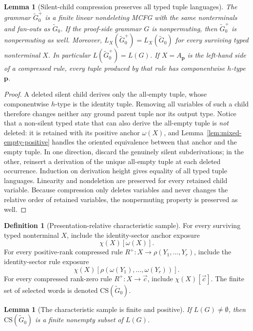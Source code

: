 \documentclass[11pt,a4paper]{article}
\numberwithin{equation}{section}
\theoremstyle{plain}
\newtheorem{lemma}[theorem]{Lemma}
\theoremstyle{definition}
\newtheorem{definition}[theorem]{Definition}
\theoremstyle{remark}
\newcommand{\CS}{\mathrm{CS}}
\newcommand{\tuple}[1]{\vec{#1}}
\begin{document}
\begin{lemma}[Silent-child compression preserves all typed tuple languages]
\label{lem:silent-compression}
The grammar \(\widetilde G_0^+\) is a finite linear nondeleting MCFG with the
same nonterminals and fan-outs as \(\widetilde G_0\).  If the proof-side grammar
\(G\) is nonpermuting, then \(\widetilde G_0^+\) is nonpermuting as well.  Moreover,
\(L_X(\widetilde G_0^+)=L_X(\widetilde G_0)\) for every surviving typed
nonterminal \(X\).  In particular \(L(\widetilde G_0^+)=L(G)\).  If
\(X=A_{\mathbf p}\) is the left-hand side of a compressed rule, every tuple
produced by that rule has componentwise \(h\)-type \(\mathbf p\).
\end{lemma}

\begin{proof}
A deleted silent child derives only the all-empty tuple, whose componentwise
\(h\)-type is the identity tuple.  Removing all variables of such a child
therefore changes neither any ground parent tuple nor its output type.  Notice
that a non-silent typed state that can also derive the all-empty tuple is
\emph{not} deleted: it is retained with its positive anchor
\(\omega(X)\), and Lemma~\ref{lem:mixed-empty-positive} handles the
oriented equivalence between that anchor and the empty tuple.  In one
direction, discard the genuinely silent subderivations; in the other, reinsert
a derivation of the unique all-empty tuple at each deleted occurrence.
Induction on derivation height gives equality of all typed tuple languages.
Linearity and nondeletion are preserved for every retained child variable.
Because compression only deletes variables and never changes the relative
order of retained variables, the nonpermuting property is preserved as well.
\end{proof}

\begin{definition}[Presentation-relative characteristic sample]
\label{def:cs}
For every surviving typed nonterminal \(X\), include the identity-sector anchor
exposure
\[
  \chi(X)[\omega(X)].
\]
For every positive-rank compressed rule
\(R^+:X\to\rho(Y_1,\ldots,Y_r)\), include the identity-sector rule exposure
\[
  \chi(X)[\rho(\omega(Y_1),\ldots,\omega(Y_r))].
\]
For every compressed rank-zero rule \(R^+:X\to\tuple c\), include
\(\chi(X)[\tuple c]\).  The finite set of selected words is denoted
\(\CS(\widetilde G_0)\).
\end{definition}

\begin{lemma}[The characteristic sample is finite and positive]
\label{lem:cs-positive}
If \(L(G)\ne\emptyset\), then \(\CS(\widetilde G_0)\) is a finite nonempty
subset of \(L(G)\).
\end{lemma}
\end{document}
